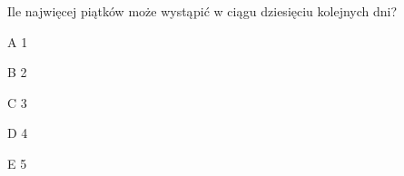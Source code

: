 \begin{tresc}
Ile najwięcej piątków może wystąpić w ciągu dziesięciu kolejnych dni?
\end{tresc}
\begin{wariant}{A} 1 \end{wariant}
\begin{wariant}{B} 2 \end{wariant}
\begin{wariant}{C} 3 \end{wariant}
\begin{wariant}{D} 4 \end{wariant}
\begin{wariant}{E} 5 \end{wariant}
